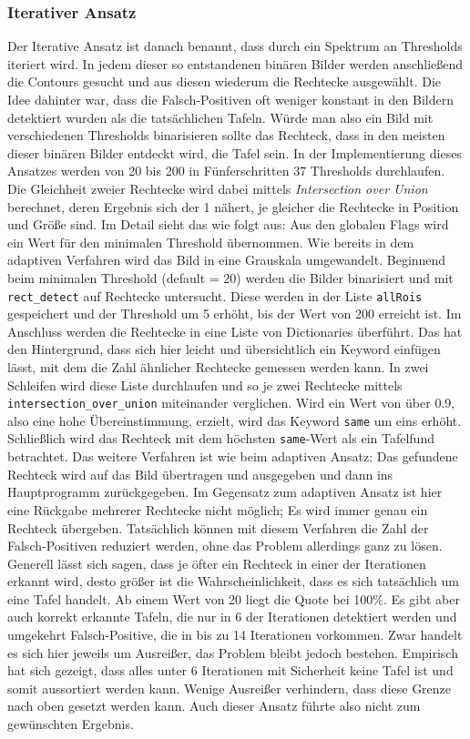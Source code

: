 \subsubsection*{Iterativer Ansatz}
Der Iterative Ansatz ist danach benannt, dass durch ein Spektrum an Thresholds iteriert wird. In jedem dieser so entstandenen binären Bilder werden anschließend die Contours gesucht und aus diesen wiederum die Rechtecke ausgewählt. Die Idee dahinter war, dass die Falsch-Positiven oft weniger konstant in den Bildern detektiert wurden als die tatsächlichen Tafeln. Würde man also ein Bild mit verschiedenen Thresholds binarisieren sollte das Rechteck, dass in den meisten dieser binären Bilder entdeckt wird, die Tafel sein. In der Implementierung dieses Ansatzes werden von 20 bis 200 in Fünferschritten 37 Thresholds durchlaufen. Die Gleichheit zweier Rechtecke wird dabei mittels \textit{Intersection over Union} berechnet, deren Ergebnis sich der 1 nähert, je gleicher die Rechtecke in Position und Größe sind. Im Detail sieht das wie folgt aus: Aus den globalen Flags wird ein Wert für den minimalen Threshold übernommen. Wie bereits in dem adaptiven Verfahren wird das Bild in eine Grauskala umgewandelt. Beginnend beim minimalen Threshold (default = 20) werden die Bilder binarisiert und mit \verb|rect_detect| auf Rechtecke untersucht. Diese werden in der Liste \verb|allRois| gespeichert und der Threshold um 5 erhöht, bis der Wert von 200 erreicht ist.
Im Anschluss werden die Rechtecke in eine Liste von Dictionaries überführt. Das hat den Hintergrund, dass sich hier leicht und übersichtlich ein Keyword einfügen lässt, mit dem die Zahl ähnlicher Rechtecke gemessen werden kann. In zwei Schleifen wird diese Liste durchlaufen und so je zwei Rechtecke mittels \verb|intersection_over_union| miteinander verglichen. Wird ein Wert von über 0.9, also eine hohe Übereinstimmung, erzielt, wird das Keyword \verb|same| um eins erhöht.
Schließlich wird das Rechteck mit dem höchsten \verb|same|-Wert als ein Tafelfund betrachtet. Das weitere Verfahren ist wie beim adaptiven Ansatz: Das gefundene Rechteck wird auf das Bild übertragen und ausgegeben und dann ins Hauptprogramm zurückgegeben. Im Gegensatz zum adaptiven Ansatz ist hier eine Rückgabe mehrerer Rechtecke nicht möglich; Es wird immer genau ein Rechteck übergeben.
Tatsächlich können mit diesem Verfahren die Zahl der Falsch-Positiven reduziert werden, ohne das Problem allerdings ganz zu lösen. Generell lässt sich sagen, dass je öfter ein Rechteck in einer der Iterationen erkannt wird, desto größer ist die Wahrscheinlichkeit, dass es sich tatsächlich um eine Tafel handelt. Ab einem Wert von 20 liegt die Quote bei 100\%. Es gibt aber auch korrekt erkannte Tafeln, die nur in 6 der Iterationen detektiert werden und umgekehrt Falsch-Positive, die in bis zu 14 Iterationen vorkommen. Zwar handelt es sich hier jeweils um Ausreißer, das Problem bleibt jedoch bestehen. Empirisch hat sich gezeigt, dass alles unter 6 Iterationen mit Sicherheit keine Tafel ist und somit aussortiert werden kann. Wenige Ausreißer verhindern, dass diese Grenze nach oben gesetzt werden kann. Auch dieser Ansatz führte also nicht zum gewünschten Ergebnis.
